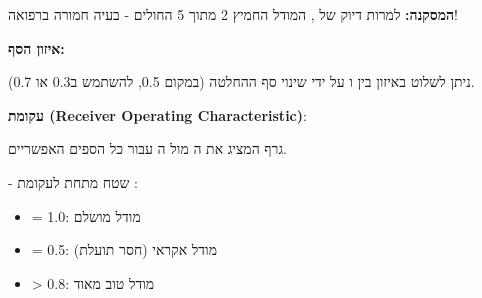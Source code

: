\textbf{המסקנה:} למרות דיוק של , המודל החמיץ \num{2} מתוך \num{5} החולים - בעיה חמורה ברפואה!

\textbf{איזון הסף:}

ניתן לשלוט באיזון בין  ו על ידי שינוי סף ההחלטה (במקום \num{0.5}, להשתמש ב\num{0.3} או \num{0.7}).

\textbf{עקומת  (Receiver Operating Characteristic)}:

גרף המציג את ה מול ה עבור כל הספים האפשריים.

\textbf{} - שטח מתחת לעקומת :
\begin{itemize}
\item {} = \num{1.0}: מודל מושלם
\item {} = \num{0.5}: מודל אקראי (חסר תועלת)
\item {} > \num{0.8}: מודל טוב מאוד
\end{itemize}

